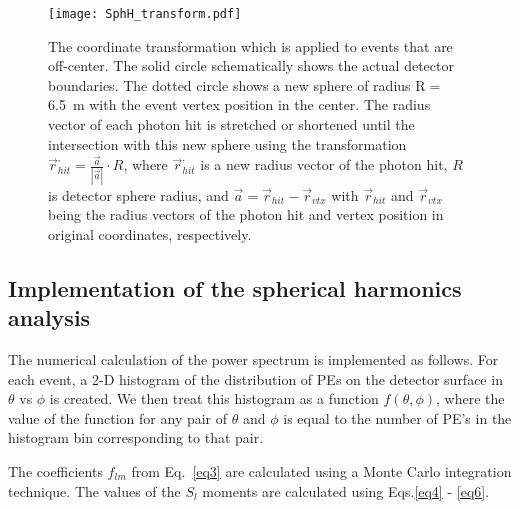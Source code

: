 \begin{figure*}[h]
  \centering
  \texttt{[image: SphH\_transform.pdf]}
  \caption{The coordinate transformation which is applied to events that are
    off-center. The solid circle schematically shows the actual detector
    boundaries. The dotted circle shows a new sphere of radius R$=$6.5~m
    with the event vertex position in the center. The radius vector of
    each photon hit is stretched or shortened until the intersection with
    this new sphere using the transformation $\vec{r}^{,}_{hit} =
    \frac{\vec{a}}{|\vec{a}|} \cdot R$, where $\vec{r}^{,}_{hit}$ is a
    new radius vector of the photon hit, $R$ is detector sphere radius,
    and $\vec{a}=\vec{r}_{hit} - \vec{r}_{vtx}$ with $\vec{r}_{hit}$
    and $\vec{r}_{vtx}$ being the radius vectors of the photon hit and
    vertex position in original coordinates, respectively.}
  \label{fig:SphH_transform}
\end{figure*}


\subsection{Implementation of the spherical harmonics analysis}

The numerical calculation of the power spectrum is implemented as follows.
For each event, a 2-D histogram of  the distribution of PEs on the
detector surface in $\theta$ vs $\phi$ is created. We then treat this
histogram as a function $f(\theta,\phi)$, where the value of the
function for any pair of $\theta$ and $\phi$ is equal to the number of
PE's in the histogram bin corresponding to that pair.

The coefficients $f_{lm}$ from Eq.~\ref{eq3} are calculated using a
Monte Carlo integration technique. The values of the $S_l$ moments are
calculated using Eqs.\ref{eq4} - \ref{eq6}. 


